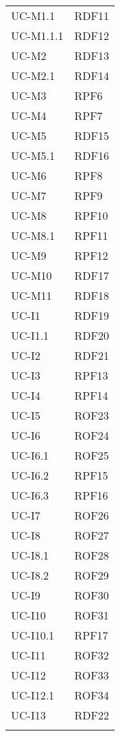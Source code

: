\begin{longtable}{| p{5cm} | p{5cm} |}
		\rowcolor{LightGray}
		UC-M1.1 & RDF11\\
		UC-M1.1.1 & RDF12\\
		\rowcolor{LightGray}
		UC-M2 & RDF13 \\
		\rowcolor{LightGray}
		UC-M2.1 & RDF14 \\
		UC-M3 & RPF6 \\
		\rowcolor{LightGray}
		UC-M4 & RPF7\\
		UC-M5 & RDF15 \\
		\rowcolor{LightGray}
		UC-M5.1 & RDF16 \\
		UC-M6 & RPF8 \\
		\rowcolor{LightGray}
		UC-M7 & RPF9 \\
		UC-M8 & RPF10\\
		\rowcolor{LightGray}
		UC-M8.1 & RPF11\\
		UC-M9 & RPF12\\
		\rowcolor{LightGray}
		UC-M10 & RDF17\\
		UC-M11 & RDF18\\
		\rowcolor{LightGray}
		UC-I1 & RDF19 \\
		UC-I1.1 & RDF20 \\
		\rowcolor{LightGray}
		UC-I2 & RDF21 \\
		UC-I3 & RPF13 \\
		\rowcolor{LightGray}
		UC-I4 & RPF14 \\
		UC-I5 & ROF23\\
		\rowcolor{LightGray}
		UC-I6 & ROF24 \\
		UC-I6.1 & ROF25 \\
		\rowcolor{LightGray}
		UC-I6.2 & RPF15 \\
		UC-I6.3 & RPF16 \\
		\rowcolor{LightGray}
		UC-I7 & ROF26\\
		UC-I8 & ROF27 \\
		\rowcolor{LightGray}
		UC-I8.1 & ROF28 \\
		UC-I8.2 & ROF29 \\
		\rowcolor{LightGray}
		UC-I9 & ROF30 \\
		UC-I10 & ROF31 \\
		\rowcolor{LightGray}
		UC-I10.1 & RPF17 \\
		\rowcolor{LightGray}
		UC-I11 & ROF32 \\
		UC-I12 & ROF33 \\
		\rowcolor{LightGray}
		UC-I12.1 & ROF34 \\
		UC-I13 & RDF22 \\
		\rowcolor{LightGray}

\end{longtable}
